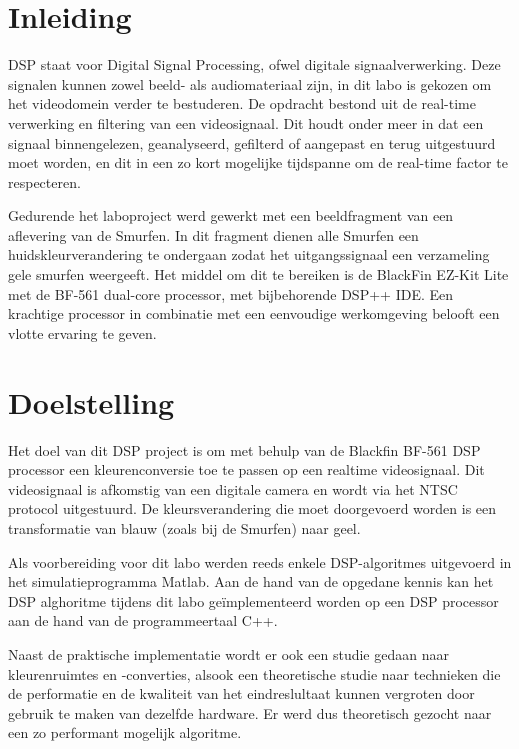 \chapter{Inleiding}

\par DSP staat voor Digital Signal Processing, ofwel digitale signaalverwerking. Deze signalen kunnen zowel beeld- als audiomateriaal zijn, in dit labo is gekozen om het videodomein verder te bestuderen. De opdracht bestond uit de real-time verwerking en filtering van een videosignaal. Dit houdt onder meer in dat een signaal binnengelezen, geanalyseerd, gefilterd of aangepast en terug uitgestuurd moet worden, en dit in een zo kort mogelijke tijdspanne om de real-time factor te respecteren.

\par Gedurende het laboproject werd gewerkt met een beeldfragment van een aflevering van de Smurfen. In dit fragment dienen alle Smurfen een huidskleurverandering te ondergaan  zodat het uitgangssignaal een verzameling gele smurfen weergeeft. Het middel om dit te bereiken is de BlackFin EZ-Kit Lite met de BF-561 dual-core processor, met bijbehorende DSP++ IDE. Een krachtige processor in combinatie met een eenvoudige werkomgeving belooft een vlotte ervaring te geven.

\chapter{Doelstelling}

\par Het doel van dit DSP project is om met behulp van de Blackfin BF-561 DSP processor een kleurenconversie toe te passen op een realtime videosignaal. Dit videosignaal is afkomstig van een digitale camera en wordt via het NTSC protocol uitgestuurd. De kleursverandering die moet doorgevoerd worden is een transformatie van blauw (zoals bij de Smurfen) naar geel. 

\par Als voorbereiding voor dit labo werden reeds enkele DSP-algoritmes uitgevoerd in het simulatieprogramma Matlab. Aan de hand van de opgedane kennis kan het DSP alghoritme tijdens dit labo ge\"implementeerd worden op een DSP processor aan de hand van de programmeertaal C++.

\par Naast de praktische implementatie wordt er ook een studie gedaan naar kleurenruimtes en -converties, alsook een theoretische studie naar technieken die de performatie en de kwaliteit van het eindreslultaat kunnen vergroten door gebruik te maken van dezelfde hardware. Er werd dus theoretisch gezocht naar een zo performant mogelijk algoritme. 

